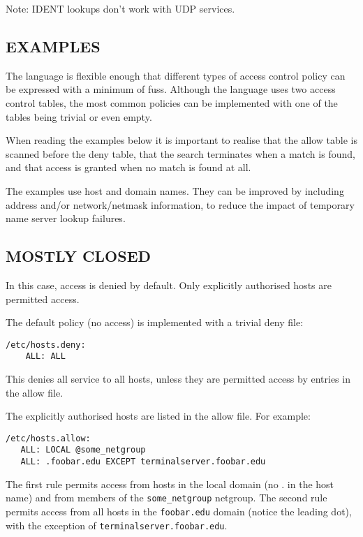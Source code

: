 \documentclass[11pt,twoside,a4paper]{book}
\begin{document}
Note: IDENT lookups don't work with UDP services. 

\subsection*{EXAMPLES}

The language is flexible enough that different types of access control
policy can be expressed with a minimum of fuss. Although the language
uses two access control tables, the most common policies can be
implemented with one of the tables being trivial or even empty.

When reading the examples below it is important to realise that the
allow table is scanned before the deny table, that the search
terminates when a match is found, and that access is granted when no
match is found at all.

The examples use host and domain names. They can be improved by
including address and/or network/netmask information, to reduce the
impact of temporary name server lookup failures.

\subsection*{MOSTLY CLOSED}

In this case, access is denied by default. Only explicitly authorised
hosts are permitted access.

The default policy (no access) is implemented with a trivial deny
file:

{\small
\begin{verbatim}
/etc/hosts.deny:
    ALL: ALL
\end{verbatim}
}

This denies all service to all hosts, unless they are permitted access
by entries in the allow file.

The explicitly authorised hosts are listed in the allow file.  For
example:

{\small
\begin{verbatim}
/etc/hosts.allow:
   ALL: LOCAL @some_netgroup
   ALL: .foobar.edu EXCEPT terminalserver.foobar.edu
\end{verbatim}
}

The first rule permits access from hosts in the local domain (no .  in
the host name) and from members of the \texttt{some\_netgroup}
netgroup.  The second rule permits access from all hosts in the
\texttt{foobar.edu} domain (notice the leading dot), with the
exception of \texttt{terminalserver.foobar.edu}.
\end{document}
